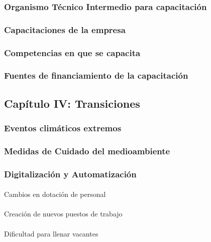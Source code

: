 \documentclass[
  11pt,
]{article}
\makeatletter
\let\oldparagraph\paragraph
\renewcommand{\paragraph}{
    \@ifstar
      \xxxParagraphStar
      \xxxParagraphNoStar
  }
\newcommand{\xxxParagraphStar}[1]{\oldparagraph*{#1}\mbox{}}
\newcommand{\xxxParagraphNoStar}[1]{\oldparagraph{#1}\mbox{}}
\makeatother
\begin{document}
\subsubsection{Organismo Técnico Intermedio para
capacitación}\label{organismo-tuxe9cnico-intermedio-para-capacitaciuxf3n}

\subsubsection{Capacitaciones de la
empresa}\label{capacitaciones-de-la-empresa}

\subsubsection{Competencias en que se
capacita}\label{competencias-en-que-se-capacita}

\subsubsection{Fuentes de financiamiento de la
capacitación}\label{fuentes-de-financiamiento-de-la-capacitaciuxf3n}

\subsection{Capítulo IV:
Transiciones}\label{capuxedtulo-iv-transiciones}

\subsubsection{Eventos climáticos
extremos}\label{eventos-climuxe1ticos-extremos}

\subsubsection{Medidas de Cuidado del
medioambiente}\label{medidas-de-cuidado-del-medioambiente}

\subsubsection{Digitalización y
Automatización}\label{digitalizaciuxf3n-y-automatizaciuxf3n}

\paragraph{Cambios en dotación de
personal}\label{cambios-en-dotaciuxf3n-de-personal}

\paragraph{Creación de nuevos puestos de
trabajo}\label{creaciuxf3n-de-nuevos-puestos-de-trabajo}

\paragraph{Dificultad para llenar
vacantes}\label{dificultad-para-llenar-vacantes}
\end{document}
